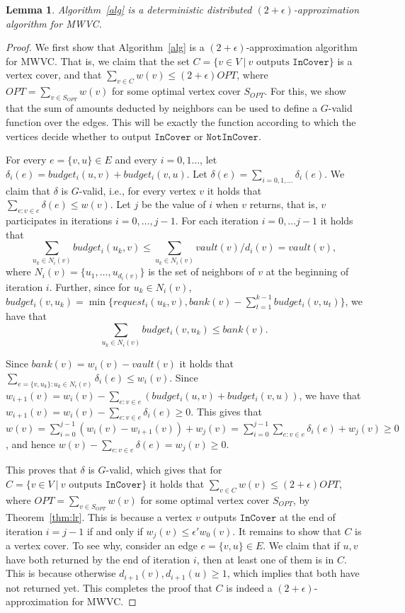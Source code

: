 \documentclass[11pt]{article}
\newtheorem{lemma}[theorem]{Lemma}
\newcommand{\Deal}{request}
\newcommand{\Vault}{vault}
\newcommand{\Bank}{bank}
\newcommand{\Budget}{budget}
\newcommand{\InCover}{\texttt{InCover}}
\newcommand{\NotInCover}{\texttt{NotInCover}}
\begin{document}
\begin{lemma}
\label{lemma:approx}
Algorithm~\ref{alg} is a deterministic distributed $(2+\epsilon)$-approximation algorithm for MWVC.
\end{lemma}
\begin{proof}
We first show that Algorithm~\ref{alg} is a $(2+\epsilon)$-approximation algorithm for MWVC. That is, we claim that the set $C=\{v \in V~|~ v \mbox{ outputs } \InCover\}$ is a vertex cover, and that $\sum_{v \in C}{w(v)} \leq (2+\epsilon)OPT$, where $OPT = \sum_{v \in S_{OPT}}{w(v)}$ for some optimal vertex cover $S_{OPT}$. For this, we show that the sum of amounts deducted by neighbors can be used to define a $G$-valid function over the edges. This will be exactly the function according to which the vertices decide whether to output $\InCover$ or $\NotInCover$.

For every $e = \{v,u\} \in E$ and every $i = 0,1 \dots$, let $\delta_i(e)=\Budget_i(u,v)+\Budget_i(v,u)$. Let $\delta(e)=\sum_{i=0,1,\dots}{\delta_i(e)}$. We claim that $\delta$ is $G$-valid, i.e., for every vertex $v$ it holds that $\sum_{e: v \in e}{\delta(e)} \leq w(v)$. Let $j$ be the value of $i$ when $v$ returns, that is, $v$ participates in iterations $i=0,\dots,j-1$. For each iteration $i=0,\dots j-1$ it holds that
$$\sum_{u_k \in N_i(v)}{\Budget_i(u_k,v)} \leq \sum_{u_k \in N_i(v)}{\Vault(v)/d_i(v)} = \Vault(v),$$
where $N_i(v)=\{u_1,\dots,u_{d_i(v)}\}$ is the set of neighbors of $v$ at the beginning of iteration $i$.
Further, since for $u_k \in N_i(v)$, $\Budget_i(v,u_k) = \min\{\Deal_i(u_k,v),\Bank(v)-\sum_{t=1}^{k-1}{\Budget_i(v,u_t)} \}$, we have that
$$\sum_{u_k \in N_i(v)}{\Budget_i(v,u_k)} \leq \Bank(v).$$

Since $\Bank(v) = w_i(v) - \Vault(v)$ it holds that $\sum_{e=\{v,u_k\}: u_k \in N_i(v)}{\delta_i(e)} \leq w_i(v)$. Since $w_{i+1}(v)= w_i(v)-\sum_{e: v \in e}{(\Budget_i(u,v)+\Budget_i(v,u))}$, we have that $w_{i+1}(v) = w_i(v)-\sum_{e: v \in e}{\delta_i(e)} \geq 0$.
This gives that $w(v) = \sum_{i=0}^{j-1}{(w_i(v)-w_{i+1}(v))}+w_j(v) = \sum_{i=0}^{j-1}{\sum_{e: v \in e}{\delta_i(e)}}+w_j(v) \geq 0$, and hence $w(v)-\sum_{e: v \in e}{\delta(e)} = w_j(v) \geq 0$.

This proves that $\delta$ is $G$-valid, which gives that for  $C=\{v \in V~|~ v \mbox{ outputs } \InCover\}$ it holds that $\sum_{v \in C}{w(v)} \leq (2+\epsilon)OPT$, where $OPT = \sum_{v \in S_{OPT}}{w(v)}$ for some optimal vertex cover $S_{OPT}$, by Theorem~\ref{thm:lr}. This is because a vertex $v$ outputs $\InCover$ at the end of iteration $i=j-1$ if and only if $w_{j}(v) \leq \epsilon' w_0(v)$. It remains to show that $C$ is a vertex cover. To see why, consider an edge $e=\{v,u\} \in E$. We claim that if $u,v$ have both returned by the end of iteration $i$, then at least one of them is in $C$. This is because otherwise $d_{i+1}(v),d_{i+1}(u) \geq 1$, which implies that both have not returned yet. This completes the proof that $C$ is indeed a $(2+\epsilon)$-approximation for MWVC.
\end{proof}
\end{document}
